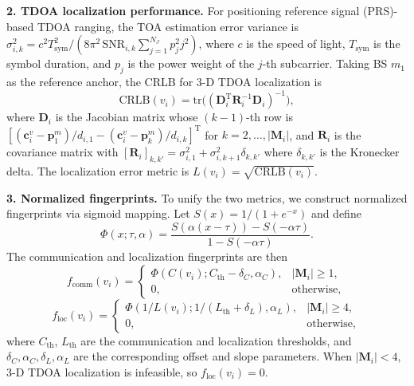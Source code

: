 \documentclass[lettersize,journal]{IEEEtran}
\begin{document}
\noindent\textbf{2. TDOA localization performance.}
For positioning reference signal (PRS)-based TDOA ranging, the TOA estimation error variance is $\sigma_{i,k}^2=c^2T_{\mathrm{sym}}^2/(8\pi^2\,\mathrm{SNR}_{i,k}\sum_{j=1}^{N_J}p_j^2j^2)$, where $c$ is the speed of light, $T_{\mathrm{sym}}$ is the symbol duration, and $p_j$ is the power weight of the $j$-th subcarrier. Taking BS $m_1$ as the reference anchor, the CRLB for 3-D TDOA localization is~\cite{ref16}
\begin{equation}
\mathrm{CRLB}(v_i)=\mathrm{tr}\big((\mathbf{D}_i^{\mathrm{T}}\mathbf{R}_i^{-1}\mathbf{D}_i)^{-1}\big),
\end{equation}
where $\mathbf{D}_i$ is the Jacobian matrix whose $(k-1)$-th row is $[(\mathbf{c}_i^v-\mathbf{p}_1^m)/d_{i,1}-(\mathbf{c}_i^v-\mathbf{p}_k^m)/d_{i,k}]^{\mathrm{T}}$ for $k=2,\ldots,|\mathbf{M}_i|$, and $\mathbf{R}_i$ is the covariance matrix with $[\mathbf{R}_i]_{k,k'}=\sigma_{i,1}^2+\sigma_{i,k+1}^2\delta_{k,k'}$ where $\delta_{k,k'}$ is the Kronecker delta. The localization error metric is $L(v_i)=\sqrt{\mathrm{CRLB}(v_i)}$.

\noindent\textbf{3. Normalized fingerprints.}
To unify the two metrics, we construct normalized fingerprints via sigmoid mapping. Let $S(x)=1/(1+e^{-x})$ and define
\begin{equation}
\Phi(x;\tau,\alpha)=\frac{S(\alpha(x-\tau))-S(-\alpha\tau)}{1-S(-\alpha\tau)}.
\end{equation}
The communication and localization fingerprints are then
\begin{equation}
f_{\mathrm{comm}}(v_i)=
\begin{cases}
\Phi(C(v_i);C_{\mathrm{th}}-\delta_C,\alpha_C), & |\mathbf{M}_i|\ge 1,\\
0, & \mathrm{otherwise},
\end{cases}
\end{equation}
\begin{equation}
f_{\mathrm{loc}}(v_i)=
\begin{cases}
\Phi(1/L(v_i);1/(L_{\mathrm{th}}+\delta_L),\alpha_L), & |\mathbf{M}_i|\ge 4,\\
0, & \mathrm{otherwise},
\end{cases}
\end{equation}
where $C_{\mathrm{th}}$, $L_{\mathrm{th}}$ are the communication and localization thresholds, and $\delta_C,\alpha_C,\delta_L,\alpha_L$ are the corresponding offset and slope parameters. When $|\mathbf{M}_i|<4$, 3-D TDOA localization is infeasible, so $f_{\mathrm{loc}}(v_i)=0$.
\end{document}
